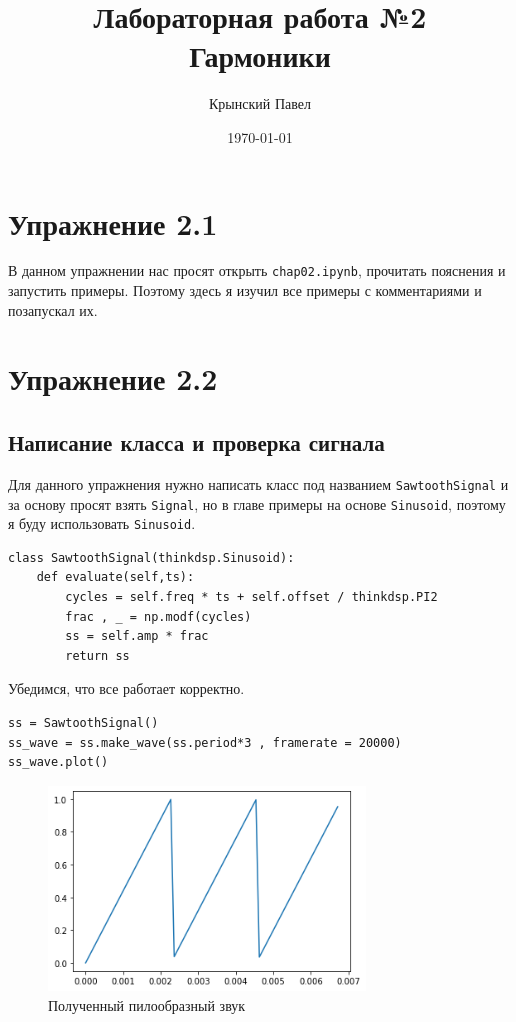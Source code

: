 \documentclass[a4paper,12pt]{report}
\title{Лабораторная работа №2\\Гармоники}
\author{Крынский Павел}
\date{\today}
\begin{document}
\maketitle
\tableofcontents
\listoffigures
\lstlistoflistings

\maketitle

\chapter{Упражнение 2.1}

В данном упражнении нас просят открыть \texttt{chap02.ipynb}, прочитать пояснения и запустить примеры. Поэтому здесь я изучил все примеры с комментариями и позапускал их.

\chapter{Упражнение 2.2}
\section{Написание класса и проверка сигнала}

Для данного упражнения нужно написать класс под названием \texttt{SawtoothSignal} и за основу просят взять \texttt{Signal}, но в главе примеры на основе \texttt{Sinusoid}, поэтому я буду использовать \texttt{Sinusoid}.

\begin{lstlisting}[caption=Класс SawtoothSignal]
class SawtoothSignal(thinkdsp.Sinusoid):
    def evaluate(self,ts):
        cycles = self.freq * ts + self.offset / thinkdsp.PI2
        frac , _ = np.modf(cycles)
        ss = self.amp * frac
        return ss
\end{lstlisting}

Убедимся, что все работает корректно.

\begin{lstlisting}[caption=Визуализация пилообразного звука]
ss = SawtoothSignal()
ss_wave = ss.make_wave(ss.period*3 , framerate = 20000)
ss_wave.plot()
\end{lstlisting}

\begin{figure}[H]
        \centering
        \includegraphics[width=0.75\textwidth]{1.png}
        \caption{Полученный пилообразный звук}
        \label{fig:fig2_1}
\end{figure}
    
\end{document}
